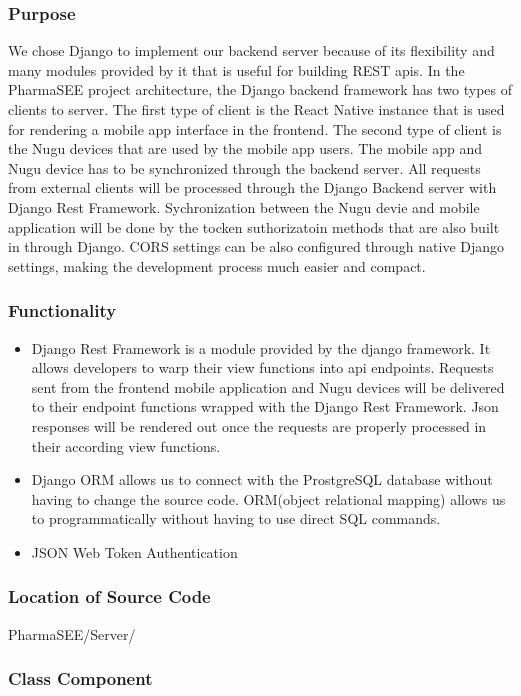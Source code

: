 \documentclass[conference]{IEEEtran}
\begin{document}
\subsubsection{Purpose}
We chose Django to implement our backend server because of its flexibility and many modules provided by it that is useful for building REST apis. In the PharmaSEE project architecture, the Django backend framework has two types of clients to server. The first type of client is the React Native instance that is used for rendering a mobile app interface in the frontend. The second type of client is the Nugu devices that are used by the mobile app users. The mobile app and Nugu device has to be synchronized through the backend server. All requests from external clients will be processed through the Django Backend server with Django Rest Framework. Sychronization between the Nugu devie and mobile application will be done by the tocken suthorizatoin methods that are also built in through Django. CORS settings can be also configured through native Django settings, making the development process much easier and compact.
\\
\subsubsection{Functionality}
\begin{itemize}
    \item Django Rest Framework is a module provided by the django framework. It allows developers to warp their view functions into api endpoints. Requests sent from the frontend mobile application and Nugu devices will be delivered to their endpoint functions wrapped with the Django Rest Framework. Json responses will be rendered out once the requests are properly processed in their according view functions.
    \item Django ORM allows us to connect with the ProstgreSQL database without having to change the source code. ORM(object relational mapping) allows us to programmatically without having to use direct SQL commands.
    \item JSON Web Token Authentication
\end{itemize}

\subsubsection{Location of Source Code}
PharmaSEE/Server/
\\
\subsubsection{Class Component}
\\
\end{document}
